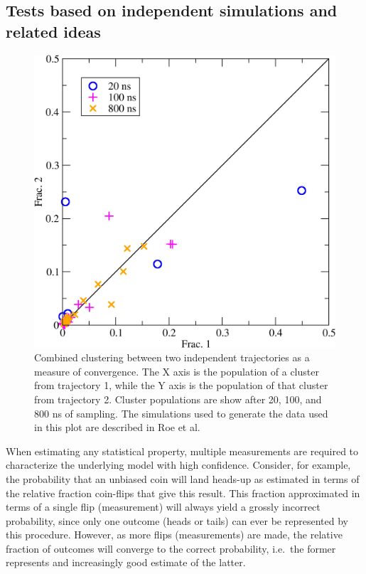\subsection{Tests based on independent simulations and related ideas}

\begin{figure}
  \centering
  \includegraphics[width=0.9\linewidth]{figures/combinedcluster}
  \caption{Combined clustering between two independent trajectories as a measure of convergence. The X axis is the population of a cluster from trajectory 1, while the Y axis is the population of that cluster from trajectory 2. Cluster populations are show after 20, 100, and 800 ns of sampling. The simulations used to generate the data used in this plot are described in Roe et al.\citep{Roe2014}}
  \label{f:combinedcluster} 
\end{figure}

When estimating any statistical property, multiple measurements are required to characterize the underlying model with high confidence. Consider, for example, the probability that an unbiased coin will land heads-up as estimated in terms of the relative fraction coin-flips that give this result.  This fraction approximated in terms of a single flip (measurement) will always yield a grossly incorrect probability, since only one outcome (heads or tails) can ever be represented by this procedure.  However, as more flips (measurements) are made, the relative fraction of outcomes will converge to the correct probability, i.e.\ the former represents and increasingly good estimate of the latter.  

